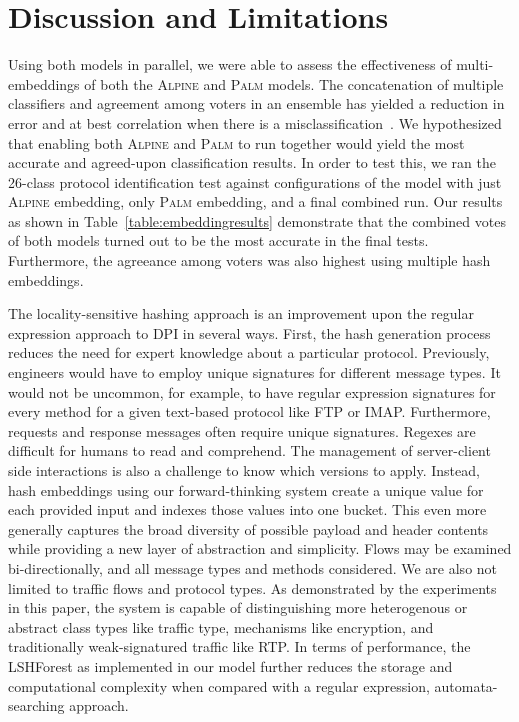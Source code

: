 \section{Discussion and Limitations}

Using both models in parallel, we were able to assess the effectiveness of multi-embeddings of both the \textsc{Alpine} and \textsc{Palm} models. The concatenation of multiple classifiers and agreement among voters in an ensemble has yielded a reduction in error and at best correlation when there is a misclassification~\cite{tumerensemble}. We hypothesized that enabling both \textsc{Alpine} and \textsc{Palm} to run together would yield the most accurate and agreed-upon classification results. In order to test this, we ran the 26-class protocol identification test against configurations of the model with just \textsc{Alpine} embedding, only \textsc{Palm} embedding, and a final combined run. Our results as shown in Table~\ref{table:embeddingresults} demonstrate that the combined votes of both models turned out to be the most accurate in the final tests. Furthermore, the agreeance among voters was also highest using multiple hash embeddings.

The locality-sensitive hashing approach is an improvement upon the regular expression approach to DPI in several ways. First, the hash generation process reduces the need for expert knowledge about a particular protocol. Previously, engineers would have to employ unique signatures for different message types. It would not be uncommon, for example, to have regular expression signatures for every method for a given text-based protocol like FTP or IMAP. Furthermore, requests and response messages often require unique signatures. Regexes are difficult for humans to read and comprehend. The management of server-client side interactions is also a challenge to know which versions to apply. Instead, hash embeddings using our forward-thinking system create a unique value for each provided input and indexes those values into one bucket. This even more generally captures the broad diversity of possible payload and header contents while providing a new layer of abstraction and simplicity. Flows may be examined bi-directionally, and all message types and methods considered. We are also not limited to traffic flows and protocol types. As demonstrated by the experiments in this paper, the system is capable of distinguishing more heterogenous or abstract class types like traffic type, mechanisms like encryption, and traditionally weak-signatured traffic like RTP. In terms of performance, the LSHForest as implemented in our model further reduces the storage and computational complexity when compared with a regular expression, automata-searching approach.

